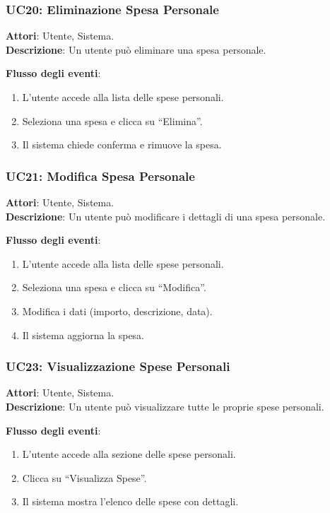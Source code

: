 \subsubsection{UC20: Eliminazione Spesa Personale}
\textbf{Attori}: Utente, Sistema. \\
\textbf{Descrizione}: Un utente può eliminare una spesa personale.

\textbf{Flusso degli eventi}:
\begin{enumerate}
    \item L’utente accede alla lista delle spese personali.
    \item Seleziona una spesa e clicca su ``Elimina''.
    \item Il sistema chiede conferma e rimuove la spesa.
\end{enumerate}

\subsubsection{UC21: Modifica Spesa Personale}
\textbf{Attori}: Utente, Sistema. \\
\textbf{Descrizione}: Un utente può modificare i dettagli di una spesa personale.

\textbf{Flusso degli eventi}:
\begin{enumerate}
    \item L’utente accede alla lista delle spese personali.
    \item Seleziona una spesa e clicca su ``Modifica''.
    \item Modifica i dati (importo, descrizione, data).
    \item Il sistema aggiorna la spesa.
\end{enumerate}

\subsubsection{UC23: Visualizzazione Spese Personali}
\textbf{Attori}: Utente, Sistema. \\
\textbf{Descrizione}: Un utente può visualizzare tutte le proprie spese personali.

\textbf{Flusso degli eventi}:
\begin{enumerate}
    \item L’utente accede alla sezione delle spese personali.
    \item Clicca su ``Visualizza Spese''.
    \item Il sistema mostra l’elenco delle spese con dettagli.
\end{enumerate}

